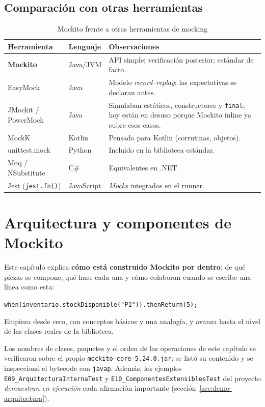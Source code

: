 \documentclass[11pt,a4paper,oneside]{report}
\newcommand{\code}[1]{\texttt{#1}}
\begin{document}
\section{Comparación con otras herramientas}
\begin{table}[H]
\centering
\caption{Mockito frente a otras herramientas de mocking}
\begin{tabularx}{\linewidth}{llX}
\toprule
\textbf{Herramienta} & \textbf{Lenguaje} & \textbf{Observaciones}\\
\midrule
\textbf{Mockito} & Java/JVM & API simple; verificación posterior; estándar de facto.\\
EasyMock & Java & Modelo \emph{record--replay}: las expectativas se declaran antes.\\
JMockit / PowerMock & Java & Simulaban estáticos, constructores y \code{final}; hoy están en desuso porque Mockito inline ya cubre esos casos.\\
MockK & Kotlin & Pensado para Kotlin (corrutinas, objetos).\\
unittest.mock & Python & Incluido en la biblioteca estándar.\\
Moq / NSubstitute & C\# & Equivalentes en .NET.\\
Jest (\code{jest.fn()}) & JavaScript & \emph{Mocks} integrados en el runner.\\
\bottomrule
\end{tabularx}
\end{table}

\chapter{Arquitectura y componentes de Mockito}
\label{cap:arquitectura}

Este capítulo explica \textbf{cómo está construido Mockito por dentro}: de qué piezas se compone, qué hace cada una y cómo colaboran cuando se escribe una línea como esta:
\begin{center}\code{when(inventario.stockDisponible("P1")).thenReturn(5);}\end{center}
Empieza desde cero, con conceptos básicos y una analogía, y avanza hasta el nivel de las clases reales de la biblioteca.

\begin{nota}
Los nombres de clases, paquetes y el orden de las operaciones de este capítulo se verificaron sobre el propio \code{mockito-core-5.24.0.jar}: se listó su contenido y se inspeccionó el bytecode con \code{javap}. Además, los ejemplos \code{E09\_ArquitecturaInternaTest} y \code{E10\_ComponentesExtensiblesTest} del proyecto \emph{demuestran en ejecución} cada afirmación importante (sección~\ref{sec:demo-arquitectura}).
\end{nota}
\end{document}
